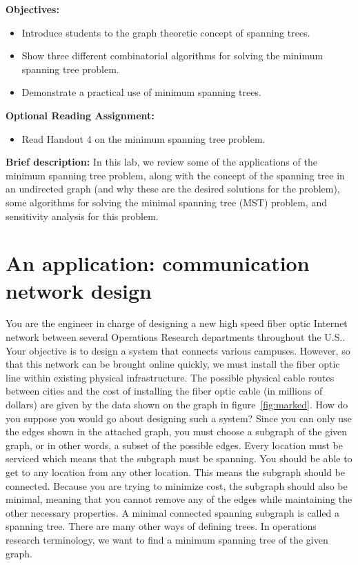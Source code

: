 \documentclass[fullpage,fleqn,leqno]{article}
\begin{document}

\noindent
\textbf{Objectives:}
\begin{itemize}
\item Introduce students to the graph theoretic concept of spanning
  trees.
\item Show three different combinatorial algorithms for solving the
  minimum spanning tree problem.
\item Demonstrate a practical use of minimum spanning trees.
\end{itemize}


\noindent 
\textbf{Optional Reading Assignment:}
\begin{itemize}
\item
Read Handout 4 on the minimum spanning tree problem.
\end{itemize}

\textbf{Brief description:} In this lab, we review some of the
applications of the minimum spanning tree problem, along with the
concept of the spanning tree in an undirected graph (and why these are
the desired solutions for the problem), some algorithms for solving
the minimal spanning tree (MST) problem, and sensitivity analysis for
this problem.



\section{An application: communication
  network design} 
  You are the engineer in charge of designing a new
high speed fiber optic Internet network between several Operations Research departments throughout the U.S.. Your objective is to design a system that
connects various campuses. However, so that
this network can be brought online quickly, we must install the fiber
optic line within existing physical infrastructure. The possible
physical cable routes between cities and the cost of installing the
fiber optic cable (in millions of dollars) are given by the data shown
on the graph in figure~\ref{fig:marked}. How do you suppose you
would go about designing such a system? Since you can only use the
edges shown in the attached graph, you must choose a subgraph of the
given graph, or in other words, a subset of the possible edges. Every
location must be serviced which means that the subgraph must be
spanning. You should be able to get to any location from any other
location. This means the subgraph should be connected. Because you are
trying to minimize cost, the subgraph should also be minimal, meaning
that you cannot remove any of the edges while maintaining the other
necessary properties. A minimal connected spanning subgraph is called
a spanning tree. There are many other ways of defining trees. In
operations research terminology, we want to find a minimum spanning
tree of the given graph.  \\
\end{document}
